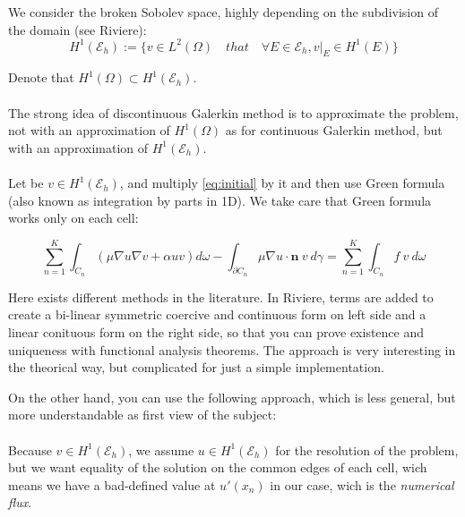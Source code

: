\documentclass[a4paper,10pt]{article}
\begin{document}
 We consider the broken Sobolev space, highly depending on the subdivision of the domain (see 
Riviere):
 \begin{equation}
  H^1(\mathcal{E}_h) := \{ v \in L^2(\Omega) \quad that \quad \forall E \in \mathcal{E}_h, v|_E \in 
H^1(E) \}
 \end{equation}

 Denote that $H^1(\Omega) \subset H^1(\mathcal{E}_h)$.
 
 \paragraph{}
 The strong idea of discontinuous Galerkin method is to approximate the problem, not with an 
approximation of $H^1(\Omega)$ as for continuous Galerkin method, but with an approximation of 
$H^1(\mathcal{E}_h)$.


\paragraph{}
Let be $v \in H^1(\mathcal{E}_h)$, and multiply \ref{eq:initial} by it and then use Green formula 
(also known as integration by parts in 1D). We take care that Green formula works only on each cell:

\begin{equation}\label{eq:weak}
 \sum \limits_{n=1}^K \int_{C_n} (\mu \nabla u \nabla v + \alpha uv) d\omega - \int_{\partial C_n} 
\mu \nabla u \cdot \mathbf{n}\ v\ d\gamma = 
\sum \limits_{n=1}^K \int_{C_n}  f\ v\ d\omega
\end{equation}

Here exists different methods in the literature. In Riviere, terms are added to create a bi-linear 
symmetric coercive and continuous form on left side and a linear conituous form on the right side, 
so that you can prove existence and uniqueness with functional analysis theorems. The approach is 
very interesting in the theorical way, but complicated for just a simple implementation.

On the other hand, you can use the following approach, which is less general, but more 
understandable as first view of the subject:

\paragraph{}
Because $v \in H^1(\mathcal{E}_h)$, we assume $u \in H^1(\mathcal{E}_h)$ for the resolution of the 
problem, but we want equality of the solution on the common edges of each cell, wich means we have 
a bad-defined value at $u'(x_n)$ in our case, wich is the \emph{numerical flux}.
\end{document}
